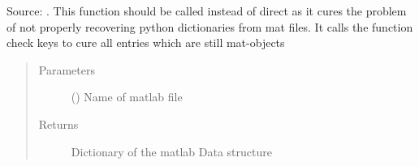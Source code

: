\documentclass[letterpaper,10pt,english]{sphinxmanual}
\begin{document}
\begin{fulllineitems}
\label{\detokenize{DataAnalyzer.Functions:DataAnalyzer.Functions.func_mat.load}}
Source: .
This function should be called instead of direct 
as it cures the problem of not properly recovering python dictionaries
from mat files. It calls the function check keys to cure all entries
which are still mat-objects
\begin{quote}\begin{description}
\item[{Parameters}] \leavevmode
{} () \textendash{} Name of matlab file

\item[{Returns}] \leavevmode
Dictionary of the matlab Data structure

\end{description}\end{quote}

\end{fulllineitems}

\end{document}
